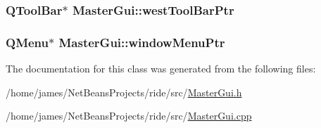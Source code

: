 \hypertarget{class_master_gui_ad8bf561c56063077e97f9a993fa38ee4}{
\subsubsection[{west\-Tool\-Bar\-Ptr}]{\setlength{\rightskip}{0pt plus 5cm}Q\-Tool\-Bar$\ast$ Master\-Gui\-::west\-Tool\-Bar\-Ptr\hspace{0.3cm}{\ttfamily [private]}}}\label{class_master_gui_ad8bf561c56063077e97f9a993fa38ee4}
\hypertarget{class_master_gui_ae33b742ac5529096317c8096984ffef1}{
\subsubsection[{window\-Menu\-Ptr}]{\setlength{\rightskip}{0pt plus 5cm}Q\-Menu$\ast$ Master\-Gui\-::window\-Menu\-Ptr\hspace{0.3cm}{\ttfamily [private]}}}\label{class_master_gui_ae33b742ac5529096317c8096984ffef1}


The documentation for this class was generated from the following files\-:\begin{DoxyCompactItemize}
\item 
/home/james/\-Net\-Beans\-Projects/ride/src/\hyperlink{_master_gui_8h}{Master\-Gui.\-h}\item 
/home/james/\-Net\-Beans\-Projects/ride/src/\hyperlink{_master_gui_8cpp}{Master\-Gui.\-cpp}\end{DoxyCompactItemize}
